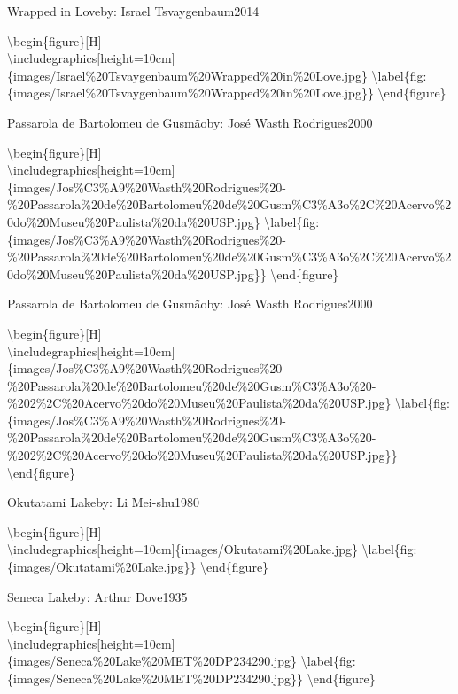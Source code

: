 \documentclass[
  a4paper,
]{book}
\begin{document}
\label{http:ux2fux2fwww.wikidata.orgux2fentityux2fQ105576317}
Wrapped in Loveby: Israel Tsvaygenbaum2014

\textbackslash begin\{figure\}{[}H{]}\\
\textbackslash includegraphics{[}height=10cm{]}\{images/Israel\%20Tsvaygenbaum\%20Wrapped\%20in\%20Love.jpg\}
\textbackslash label\{fig:\{images/Israel\%20Tsvaygenbaum\%20Wrapped\%20in\%20Love.jpg\}\}
\textbackslash end\{figure\}

\label{http:ux2fux2fwww.wikidata.orgux2fentityux2fQ55852280}
Passarola de Bartolomeu de Gusmãoby: José Wasth Rodrigues2000

\textbackslash begin\{figure\}{[}H{]}\\
\textbackslash includegraphics{[}height=10cm{]}\{images/Jos\%C3\%A9\%20Wasth\%20Rodrigues\%20-\%20Passarola\%20de\%20Bartolomeu\%20de\%20Gusm\%C3\%A3o\%2C\%20Acervo\%20do\%20Museu\%20Paulista\%20da\%20USP.jpg\}
\textbackslash label\{fig:\{images/Jos\%C3\%A9\%20Wasth\%20Rodrigues\%20-\%20Passarola\%20de\%20Bartolomeu\%20de\%20Gusm\%C3\%A3o\%2C\%20Acervo\%20do\%20Museu\%20Paulista\%20da\%20USP.jpg\}\}
\textbackslash end\{figure\}

\label{http:ux2fux2fwww.wikidata.orgux2fentityux2fQ55852494}
Passarola de Bartolomeu de Gusmãoby: José Wasth Rodrigues2000

\textbackslash begin\{figure\}{[}H{]}\\
\textbackslash includegraphics{[}height=10cm{]}\{images/Jos\%C3\%A9\%20Wasth\%20Rodrigues\%20-\%20Passarola\%20de\%20Bartolomeu\%20de\%20Gusm\%C3\%A3o\%20-\%202\%2C\%20Acervo\%20do\%20Museu\%20Paulista\%20da\%20USP.jpg\}
\textbackslash label\{fig:\{images/Jos\%C3\%A9\%20Wasth\%20Rodrigues\%20-\%20Passarola\%20de\%20Bartolomeu\%20de\%20Gusm\%C3\%A3o\%20-\%202\%2C\%20Acervo\%20do\%20Museu\%20Paulista\%20da\%20USP.jpg\}\}
\textbackslash end\{figure\}

\label{http:ux2fux2fwww.wikidata.orgux2fentityux2fQ56807932}
Okutatami Lakeby: Li Mei-shu1980

\textbackslash begin\{figure\}{[}H{]}\\
\textbackslash includegraphics{[}height=10cm{]}\{images/Okutatami\%20Lake.jpg\}
\textbackslash label\{fig:\{images/Okutatami\%20Lake.jpg\}\}
\textbackslash end\{figure\}

\label{http:ux2fux2fwww.wikidata.orgux2fentityux2fQ19917454}
Seneca Lakeby: Arthur Dove1935

\textbackslash begin\{figure\}{[}H{]}\\
\textbackslash includegraphics{[}height=10cm{]}\{images/Seneca\%20Lake\%20MET\%20DP234290.jpg\}
\textbackslash label\{fig:\{images/Seneca\%20Lake\%20MET\%20DP234290.jpg\}\}
\textbackslash end\{figure\}
\end{document}
